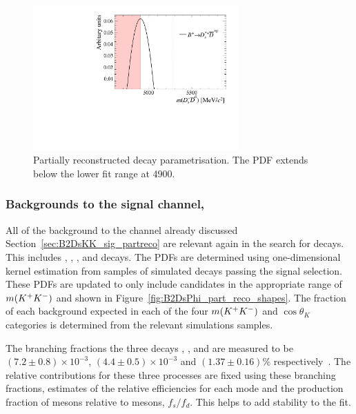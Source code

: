 \begin{figure}[!h]
    \centering
    \includegraphics[width=0.70\textwidth]{figs/B2DsPhi/DsstarDstar0_part_reco_Shapes.pdf}
    \caption{Partially reconstructed \decay{\Bp}{\Dssp\Dstarzb} decay parametrisation. The PDF extends below the lower fit range at 4900\mevcc.}
    \label{fig:B2DsPhi_DsstarDstar0_partreco}   
\end{figure}



\subsubsection{Backgrounds to the signal channel, \decay{\Bp}{\Dsp\phiz}}
\label{sec:B2DsPhi_part_recto_sig}

All of the background to the \decay{\Bp}{\Dsp\Kp\Km} channel already discussed Section~\ref{sec:B2DsKK_sig_partreco} are relevant again in the search for \decay{\Bp}{\Dsp\phiz} decays. This includes \decay{\Bsb}{\Dsp\Km\Kstarz}, \decay{\Bsb}{\Dssp\Km\Kstarz}, \decay{\Bsb}{\Dsp\Dsm}, \decay{\Bzb}{\Dsp\Dm} and \decay{\Bsb}{\Dssp\Dsm} decays. The PDFs are determined using one-dimensional kernel estimation from samples of simulated decays passing the signal selection. These PDFs are updated to only include candidates in the appropriate range of $m({{K}^+}{{K}^-})$ and shown in Figure~\ref{fig:B2DsPhi_part_reco_shapes}. The fraction of each background expected in each of the four $m({{K}^+}{{K}^-})$ and $\cos\theta_{K}$ categories is determined from the relevant simulations samples.

The branching fractions the three decays \decay{\Bzb}{\Dsp\Dm}, \decay{\Bsb}{\Dsp\Dsm}, and \decay{\Bsb}{\Dssp\Dsm} are measured to be $(7.2 \pm 0.8 ) \times 10^{-3}$, $(4.4 \pm 0.5 ) \times 10^{-3}$ and $(1.37 \pm 0.16 ) \%$ respectively~\cite{PDG2016}. The relative contributions for these three processes are fixed using these branching fractions, estimates of the relative efficiencies for each mode and the production fraction of \Bsb mesons relative to \Bzb mesons, $f_{s}/f_{d}$. This helps to add stability to the fit.


